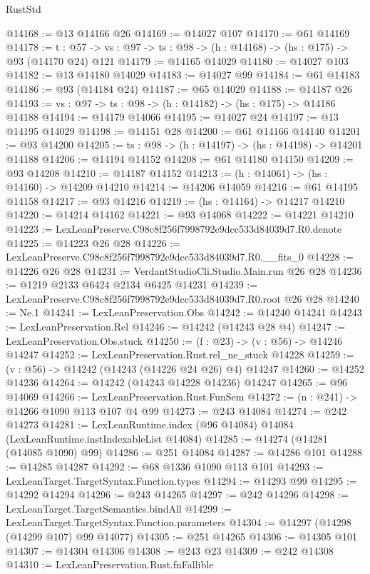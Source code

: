 \begin{lexlean}{RustStd}
\begin{coremodule}
@14168 := @13 @14166 @26
@14169 := @14027 @107
@14170 := @61 @14169
@14178 := {t : @57} ->
  {vs : @97} -> {ts : @98} -> (h : @14168) -> (hs : @175) -> @93 (@14170 @24) @121
@14179 := @14165 @14029
@14180 := @14027 @103
@14182 := @13 @14180 @14029
@14183 := @14027 @99
@14184 := @61 @14183
@14186 := @93 (@14184 @24)
@14187 := @65 @14029
@14188 := @14187 @26
@14193 := {vs : @97} -> {ts : @98} -> (h : @14182) -> (hs : @175) -> @14186 @14188
@14194 := @14179 @14066
@14195 := @14027 @24
@14197 := @13 @14195 @14029
@14198 := @14151 @28
@14200 := @61 @14166 @14140
@14201 := @93 @14200
@14205 := {ts : @98} -> (h : @14197) -> (hs : @14198) -> @14201 @14188
@14206 := @14194 @14152
@14208 := @61 @14180 @14150
@14209 := @93 @14208
@14210 := @14187 @14152
@14213 := (h : @14061) -> (hs : @14160) -> @14209 @14210
@14214 := @14206 @14059
@14216 := @61 @14195 @14158
@14217 := @93 @14216
@14219 := (hs : @14164) -> @14217 @14210
@14220 := @14214 @14162
@14221 := @93 @14068
@14222 := @14221 @14210
@14223 := LexLeanPreserve.C98c8f256f7998792e9dcc533d84039d7.R0.denote
@14225 := @14223 @26 @28
@14226 := LexLeanPreserve.C98c8f256f7998792e9dcc533d84039d7.R0.__fits_0
@14228 := @14226 @26 @28
@14231 := VerdantStudioCli.Studio.Main.run @26 @28
@14236 := @1219 @2133 @6424 @2134 @6425 @14231
@14239 := LexLeanPreserve.C98c8f256f7998792e9dcc533d84039d7.R0.root @26 @28
@14240 := Ne.{1}
@14241 := LexLeanPreservation.Obs
@14242 := @14240 @14241
@14243 := LexLeanPreservation.Rel
@14246 := @14242 (@14243 @28 @4)
@14247 := LexLeanPreservation.Obs.stuck
@14250 := (f : @23) -> (v : @56) -> @14246 @14247
@14252 := LexLeanPreservation.Rust.rel_ne_stuck @14228
@14259 := (v : @56) -> @14242 (@14243 (@14226 @24 @26) @4) @14247
@14260 := @14252 @14236
@14264 := @14242 (@14243 @14228 @14236) @14247
@14265 := @96 @14069
@14266 := LexLeanPreservation.Rust.FunSem
@14272 := (n : @241) -> @14266 @1090 @113 @107 @4 @99
@14273 := @243 @14084
@14274 := @242 @14273
@14281 := LexLeanRuntime.index (@96 @14084) @14084 (LexLeanRuntime.instIndexableList @14084)
@14285 := @14274 (@14281 (@14085 @1090) @99)
@14286 := @251 @14084
@14287 := @14286 @101
@14288 := @14285 @14287
@14292 := @68 @1336 @1090 @113 @101
@14293 := LexLeanTarget.TargetSyntax.Function.types
@14294 := @14293 @99
@14295 := @14292 @14294
@14296 := @243 @14265
@14297 := @242 @14296
@14298 := LexLeanTarget.TargetSemantics.bindAll
@14299 := LexLeanTarget.TargetSyntax.Function.parameters
@14304 := @14297 (@14298 (@14299 @107) @99 @14077)
@14305 := @251 @14265
@14306 := @14305 @101
@14307 := @14304 @14306
@14308 := @243 @23
@14309 := @242 @14308
@14310 := LexLeanPreservation.Rust.fnFallible

\end{coremodule}
\end{lexlean}
